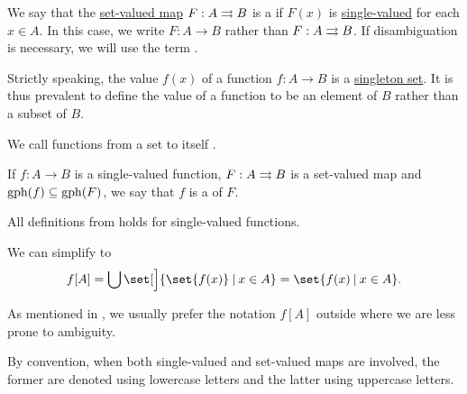 \begin{definition}\label{def:function}
  We say that the \hyperref[def:function]{set-valued map} \( F: A \rightrightarrows B \) is a  if \( F(x) \) is \hyperref[def:set_valued_map/value]{single-valued} for each \( x \in A \). In this case, we write \( F: A \to B \) rather than \( F: A \rightrightarrows B \). If disambiguation is necessary, we will use the term .

  Strictly speaking, the value \( f(x) \) of a function \( f: A \to B \) is a \hyperref[def:subsingleton_set]{singleton set}. It is thus prevalent to define the value of a function to be an element of \( B \) rather than a subset of \( B \).

  \begin{thmenum}
     We call functions from a set to itself .

    \medskip

     If \( f: A \to B \) is a single-valued function, \( F: A \rightrightarrows B \) is a set-valued map and \( \operatorname{gph}(f) \subseteq \operatorname{gph}(F) \), we say that \( f \) is a  of \( F \).
  \end{thmenum}
\end{definition}
\begin{comments}
  \item All definitions from  holds for single-valued functions.

  \item We can simplify  to
  \begin{equation*}
    f[A]
    =
    \bigcup \set[\Big]{ \set{ f(x) } \given x \in A }
    =
    \set{ f(x) \given x \in A }.
  \end{equation*}

  As mentioned in , we usually prefer the notation \( f[A] \) outside  where we are less prone to ambiguity.

  \item By convention, when both single-valued and set-valued maps are involved, the former are denoted using lowercase letters and the latter using uppercase letters.
\end{comments}

